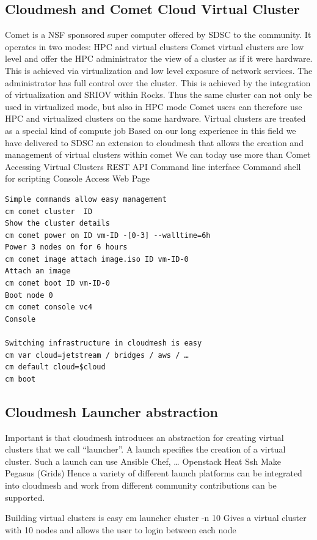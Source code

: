 \subsection{Cloudmesh and Comet Cloud Virtual Cluster}
Comet is a NSF sponsored super computer offered by SDSC to the community. It operates in two modes: HPC and virtual clusters
Comet virtual clusters are low level and offer the HPC administrator the view of a cluster as if it were hardware. This is achieved via virtualization and low level exposure of network services. The administrator has full control over the cluster.
This is achieved by the integration of virtualization and SRIOV within Rocks. Thus the same cluster can not only be used in virtualized mode, but also in HPC mode
Comet users can therefore use HPC and virtualized clusters on the same hardware. Virtual clusters are treated as a special kind of compute job
Based on our long experience in this field we have delivered to SDSC an extension to cloudmesh that allows the creation and management of virtual clusters within comet
We can today use more than Comet
Accessing Virtual Clusters
REST API
Command line interface
Command shell for scripting
Console Access
Web Page

\begin{Verbatim}
Simple commands allow easy management
cm comet cluster  ID
Show the cluster details
cm comet power on ID vm-ID -[0-3] --walltime=6h
Power 3 nodes on for 6 hours
cm comet image attach image.iso ID vm-ID-0
Attach an image
cm comet boot ID vm-ID-0
Boot node 0
cm comet console vc4
Console 

Switching infrastructure in cloudmesh is easy
cm var cloud=jetstream / bridges / aws / …
cm default cloud=$cloud
cm boot
\end{Verbatim}

\subsection{Cloudmesh Launcher abstraction}
Important is that cloudmesh introduces an abstraction for creating virtual clusters that we call “launcher”. A launch specifies the creation of a virtual cluster. Such a launch can use
Ansible
Chef, …
Openstack Heat
Ssh
Make
Pegasus (Grids)
Hence a variety of different launch platforms can be integrated into cloudmesh and work from different community contributions can be supported.

Building virtual clusters is easy
cm launcher cluster -n 10
Gives a virtual cluster with 10 nodes and allows the user to login between each node


